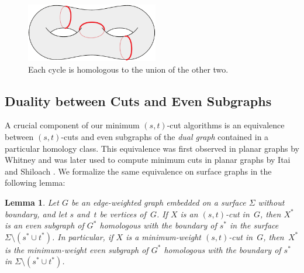 \documentclass[11pt,twoside]{article}
\def\Cut{X}
\newtheorem{lemma}[theorem]{Lemma}
\begin{document}
\begin{figure}[htb]
\centering
\includegraphics[height=1in]{Fig/homologous1}
\caption{Each cycle is homologous to the union of the other two.}
\label{fig:homology2}
\end{figure}


\subsection{Duality between Cuts and Even Subgraphs}
\label{SS:duality}


A crucial component of our minimum $(s,t)$-cut algorithms is an equivalence between $(s,t)$-cuts and even subgraphs of the \emph{dual graph} contained in a particular homology class.  This equivalence was first observed in planar graphs by Whitney \cite{w-pg-33} and was later used to compute minimum cuts in planar graphs by Itai and Shiloach \cite{is-mfpn-79}.
We formalize the same equivalence on surface graphs in the following lemma:

\begin{lemma}
\label{lem:cut-duality}
Let $G$ be an edge-weighted graph embedded on a surface $\Sigma$ without boundary, and let $s$ and~$t$ be vertices of~$G$.  If $\Cut$ is an $(s,t)$-cut in~$G$, then $\Cut^*$ is an even subgraph of $G^*$ homologous with the boundary of $s^*$ in the surface $\Sigma\setminus(s^*\cup t^*)$.  In particular, if $X$ is a minimum-weight $(s,t)$-cut in~$G$, then~$\Cut^*$ is the minimum-weight even subgraph of $G^*$ homologous with the boundary of $s^*$ in $\Sigma\setminus(s^*\cup t^*)$.
\end{lemma}
\end{document}
